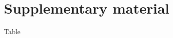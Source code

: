 \documentclass{article}
\begin{document}
\pagestyle{empty}
\section*{Supplementary material}

Table



\end{document}
